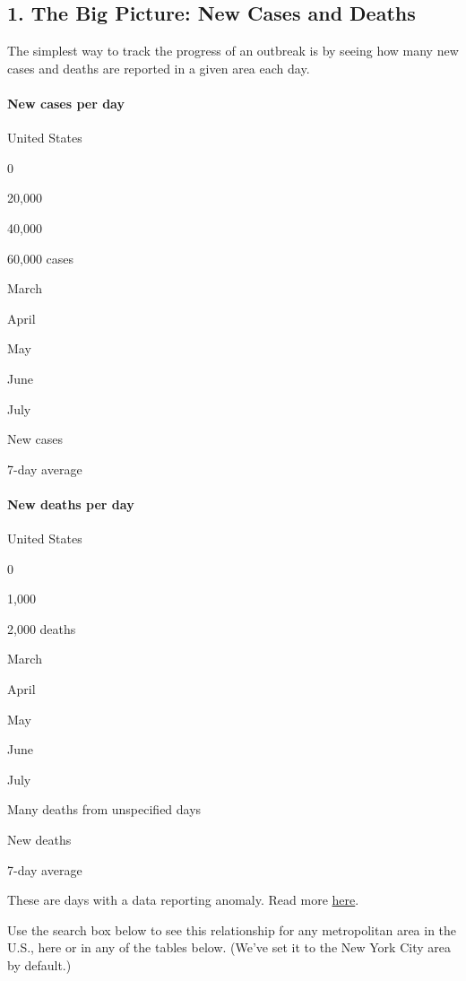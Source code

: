 \hypertarget{1-the-big-picture-new-cases-and-deaths}{%
\subsection{1. The Big Picture: New Cases and
Deaths}\label{1-the-big-picture-new-cases-and-deaths}}

The simplest way to track the progress of an outbreak is by seeing how
many new cases and deaths are reported in a given area each day.

\hypertarget{new-cases-per-day}{%
\paragraph{New cases per day}\label{new-cases-per-day}}

United States

0

20,000

40,000

60,000 cases

March

April

May

June

July

New cases

7-day average

\hypertarget{new-deaths-per-day}{%
\paragraph{New deaths per day}\label{new-deaths-per-day}}

United States

0

1,000

2,000 deaths

March

April

May

June

July

Many deaths from unspecified days

New deaths

7-day average

These are days with a data reporting anomaly. Read more
\protect\hyperlink{anomaly-notes}{here}.

Use the search box below to see this relationship for any metropolitan
area in the U.S., here or in any of the tables below. (We've set it to
the New York City area by default.)

